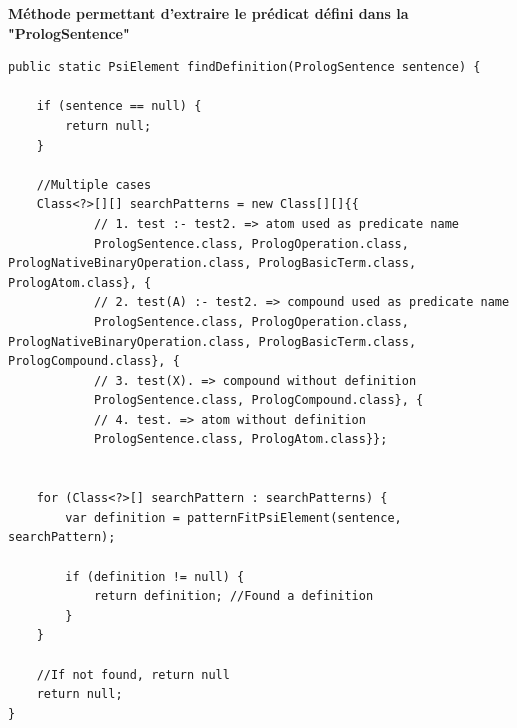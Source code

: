 \noindent \textbf{Méthode permettant d'extraire le prédicat défini dans la "PrologSentence"}

\begin{lstlisting}[label={lst:method_find_predicate_in_sentence}, caption={Méthode permettant d'extraire le prédicat défini dans la "PrologSentence"}]
public static PsiElement findDefinition(PrologSentence sentence) {

    if (sentence == null) {
        return null;
    }

    //Multiple cases
    Class<?>[][] searchPatterns = new Class[][]{{
            // 1. test :- test2. => atom used as predicate name
            PrologSentence.class, PrologOperation.class, PrologNativeBinaryOperation.class, PrologBasicTerm.class, PrologAtom.class}, {
            // 2. test(A) :- test2. => compound used as predicate name
            PrologSentence.class, PrologOperation.class, PrologNativeBinaryOperation.class, PrologBasicTerm.class, PrologCompound.class}, {
            // 3. test(X). => compound without definition
            PrologSentence.class, PrologCompound.class}, {
            // 4. test. => atom without definition
            PrologSentence.class, PrologAtom.class}};


    for (Class<?>[] searchPattern : searchPatterns) {
        var definition = patternFitPsiElement(sentence, searchPattern);

        if (definition != null) {
            return definition; //Found a definition
        }
    }

    //If not found, return null
    return null;
}
\end{lstlisting}

